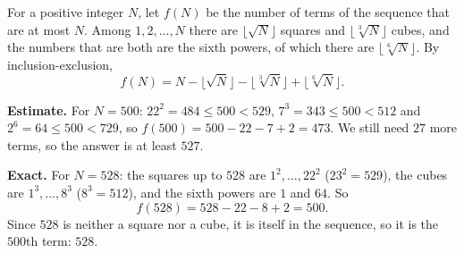 For a positive integer $N$, let $f(N)$ be the number of terms of the sequence that are at most $N$. Among $1,2,\dots,N$ there are $\lfloor\sqrt N\rfloor$ squares and $\lfloor\sqrt[3]N\rfloor$ cubes, and the numbers that are both are the sixth powers, of which there are $\lfloor\sqrt[6]N\rfloor$. By inclusion-exclusion,
\[f(N)=N-\lfloor\sqrt N\rfloor-\lfloor\sqrt[3]N\rfloor+\lfloor\sqrt[6]N\rfloor.\]

\textbf{Estimate.} For $N=500$: $22^2=484\le500<529$, $7^3=343\le500<512$ and $2^6=64\le500<729$, so $f(500)=500-22-7+2=473$. We still need $27$ more terms, so the answer is at least $527$.

\textbf{Exact.} For $N=528$: the squares up to $528$ are $1^2,\dots,22^2$ ($23^2=529$), the cubes are $1^3,\dots,8^3$ ($8^3=512$), and the sixth powers are $1$ and $64$. So
\[f(528)=528-22-8+2=500.\]
Since $528$ is neither a square nor a cube, it is itself in the sequence, so it is the $500$th term: $\boxed{528}$.
